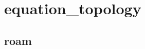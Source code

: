 \def\state#1{#1}
\def\object#1{#1}
\def\cursor#1{#1}
\def\leftnextstate#1{#1}
\def\leftaction#1{#1}
\def\rightnextstate#1{#1}
\def\rightaction#1{#1}
\section{equation\_topology}
\subsection{roam}
\begin{tabular}{|l|l|l|l|}
\end{tabular}
\\
